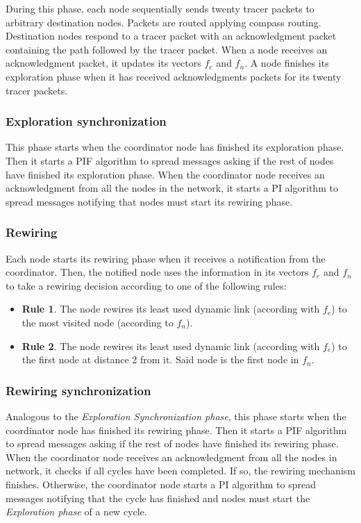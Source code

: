 During this phase, each node sequentially sends twenty tracer packets to arbitrary destination nodes. Packets are routed applying compass routing. Destination nodes respond to a tracer packet with an acknowledgment packet containing the path followed by the tracer packet.
When a node receives an acknowledgment packet, it updates its vectors $f_e$ and $f_n$. A node finishes its exploration phase when it has received acknowledgments packets for its twenty tracer packets.

\subsubsection{Exploration synchronization}

This phase starts when the coordinator node has finished its exploration phase. Then it starts a PIF algorithm to spread messages asking if the rest of nodes have finished its exploration phase. When the coordinator node receives an acknowledgment from all the nodes in the network,  it starts a PI algorithm to spread messages notifying that nodes must start its rewiring phase.

\subsubsection{Rewiring}

Each node starts its rewiring phase when it receives a notification from the coordinator. Then, the notified node uses the information in its vectors $f_e$ and $f_n$ to take a rewiring decision according to one of the following rules:
\begin{itemize}
    \item \textbf{Rule 1}. The node rewires its least used dynamic link (according with $f_e$) to the most visited node (according to $f_n$).
    \item \textbf{Rule 2}. The node rewires its least used dynamic link (according with $f_e$) to the first node at distance 2 from it. Said node is the first node in $f_n$.
\end{itemize}

\subsubsection{Rewiring synchronization}

Analogous to the \textit{Exploration Synchronization phase}, this phase starts when the coordinator node has finished its rewiring phase. Then it starts a PIF algorithm to spread messages asking if the rest of nodes have finished its rewiring phase. When the coordinator node receives an acknowledgment from all the nodes in network, it checks if all cycles have been completed. If so, the rewiring mechanism finishes. Otherwise, the coordinator node starts a PI algorithm to spread messages notifying that the cycle has finished and nodes must start the \textit{Exploration phase} of a new cycle.
